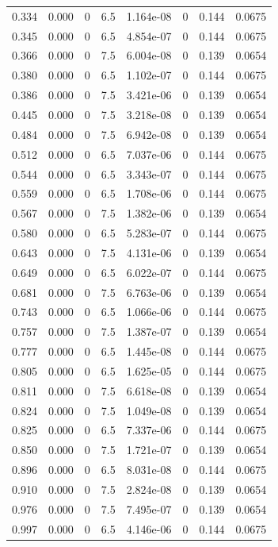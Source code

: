 \documentclass[preview]{standalone}
\begin{document}
{{\begin{tabular}{L{1.2cm}C{1.2cm} C{0.3cm}C{0.5cm} C{1.4cm}C{1.4cm} C{1.4cm}C{1.4cm}}
  0.334  &  0.000  & 0     & 6.5 &  1.164e-08  & 0  & 0.144 &  0.0675   \\ 
  0.345  &  0.000  & 0     & 6.5 &  4.854e-07  & 0  & 0.144 &  0.0675   \\ 
  0.366  &  0.000  & 0     & 7.5 &  6.004e-08  & 0  & 0.139 &  0.0654   \\ 
  0.380  &  0.000  & 0     & 6.5 &  1.102e-07  & 0  & 0.144 &  0.0675   \\ 
  0.386  &  0.000  & 0     & 7.5 &  3.421e-06  & 0  & 0.139 &  0.0654   \\ 
  0.445  &  0.000  & 0     & 7.5 &  3.218e-08  & 0  & 0.139 &  0.0654   \\ 
  0.484  &  0.000  & 0     & 7.5 &  6.942e-08  & 0  & 0.139 &  0.0654   \\ 
  0.512  &  0.000  & 0     & 6.5 &  7.037e-06  & 0  & 0.144 &  0.0675   \\ 
  0.544  &  0.000  & 0     & 6.5 &  3.343e-07  & 0  & 0.144 &  0.0675   \\ 
  0.559  &  0.000  & 0     & 6.5 &  1.708e-06  & 0  & 0.144 &  0.0675   \\ 
  0.567  &  0.000  & 0     & 7.5 &  1.382e-06  & 0  & 0.139 &  0.0654   \\ 
  0.580  &  0.000  & 0     & 6.5 &  5.283e-07  & 0  & 0.144 &  0.0675   \\ 
  0.643  &  0.000  & 0     & 7.5 &  4.131e-06  & 0  & 0.139 &  0.0654   \\ 
  0.649  &  0.000  & 0     & 6.5 &  6.022e-07  & 0  & 0.144 &  0.0675   \\ 
  0.681  &  0.000  & 0     & 7.5 &  6.763e-06  & 0  & 0.139 &  0.0654   \\ 
  0.743  &  0.000  & 0     & 6.5 &  1.066e-06  & 0  & 0.144 &  0.0675   \\ 
  0.757  &  0.000  & 0     & 7.5 &  1.387e-07  & 0  & 0.139 &  0.0654   \\ 
  0.777  &  0.000  & 0     & 6.5 &  1.445e-08  & 0  & 0.144 &  0.0675   \\ 
  0.805  &  0.000  & 0     & 6.5 &  1.625e-05  & 0  & 0.144 &  0.0675   \\ 
  0.811  &  0.000  & 0     & 7.5 &  6.618e-08  & 0  & 0.139 &  0.0654   \\ 
  0.824  &  0.000  & 0     & 7.5 &  1.049e-08  & 0  & 0.139 &  0.0654   \\ 
  0.825  &  0.000  & 0     & 6.5 &  7.337e-06  & 0  & 0.144 &  0.0675   \\ 
  0.850  &  0.000  & 0     & 7.5 &  1.721e-07  & 0  & 0.139 &  0.0654   \\ 
  0.896  &  0.000  & 0     & 6.5 &  8.031e-08  & 0  & 0.144 &  0.0675   \\ 
  0.910  &  0.000  & 0     & 7.5 &  2.824e-08  & 0  & 0.139 &  0.0654   \\ 
  0.976  &  0.000  & 0     & 7.5 &  7.495e-07  & 0  & 0.139 &  0.0654   \\ 
  0.997  &  0.000  & 0     & 6.5 &  4.146e-06  & 0  & 0.144 &  0.0675   \\ 
\hline 
\end{tabular} 

}}
\end{document}
